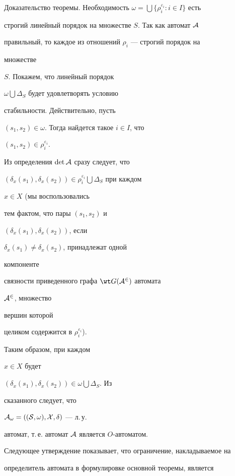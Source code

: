 \begin{pf*}{Доказательство теоремы. Необходимость}
$\omega=\bigcup\{\rho^{\varepsilon_i}_i:i\in I\}$ есть


строгий линейный порядок на множестве $S$. Так как автомат $\cal A$


правильный, то каждое из отношений $\rho_i$ --- строгий порядок на


множестве


$S$. Покажем, что линейный порядок


$\omega\bigcup\Delta_S$ будет удовлетворять условию


стабильности. Действительно, пусть


$(s_1,s_2)\in\omega$. Тогда найдется такое $i\in I$, что


$(s_1,s_2)\in\rho^{\varepsilon_i}_i$.


Из определения $\det\cal A$ сразу следует, что


$(\delta_x(s_1),\delta_x(s_2))\in\rho^{\varepsilon_i}_i\bigcup


\Delta_S$ при каждом


$x\in X$ (мы воспользовались


тем фактом, что пары $(s_1,s_2)$ и


$(\delta_x(s_1),\delta_x(s_2))$, если


$\delta_x(s_1)\ne\delta_x(s_2)$, принадлежат одной


компоненте


связности приведенного графа $\wt G(\cal A^2)$ автомата


$\cal A^2$, множество


вершин которой


целиком содержится в $\rho^{\varepsilon_i}_i$).


Таким образом, при каждом


$x\in X$ будет


$(\delta_x(s_1),\delta_x(s_2))\in\omega\bigcup\Delta_S$. Из


сказанного следует, что


$\cal A_\omega=((S,\omega),X,\delta)$ --- л.\,у.


автомат, т.\,е. автомат $\cal A$ является $O$-автоматом.


\end{pf*}





Следующее утверждение показывает, что ограничение, накладываемое на


определитель автомата в формулировке основной теоремы, является


